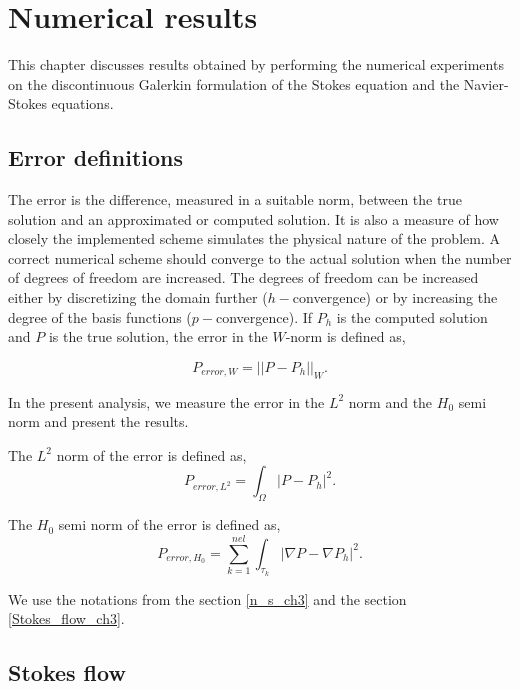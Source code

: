 \documentclass[a4paper,twoside,openright]{book}
\begin{document}
\chapter{Numerical results}

This chapter discusses results obtained by performing the numerical experiments on the discontinuous Galerkin formulation of the Stokes equation and the Navier-Stokes equations.

\section{Error definitions}

The error is the difference, measured in a suitable norm, between the true solution and an approximated or computed solution. It is also a measure of how closely the implemented scheme simulates the physical nature of the problem. A correct numerical scheme should converge to the actual solution when the number of degrees of freedom are increased. The degrees of freedom can be increased either by discretizing the domain further ($h-$convergence) or by increasing the degree of the basis functions ($p-$convergence). If $P_h$ is the computed solution and $P$ is the true solution, the error in the $W$-norm is defined as,

\begin{equation} \label{error_definition}
P_{error,W} = ||P - P_h||_{W} \mathrm{.}
\end{equation}

In the present analysis, we measure the error in the $L^2$ norm and the $H_0$ semi norm and present the results.

The $L^2$ norm of the error is defined as,
\begin{equation}
P_{error,L^2} = \int_{\Omega} |P - P_h|^2 \mathrm{.}
\end{equation}

The $H_0$ semi norm of the error is defined as,\begin{equation}
P_{error,H_0} = \sum_{k=1}^{nel} \int_{\tau_k} |\nabla P - \nabla P_h|^2 \mathrm{.}
\end{equation}

We use the notations from the section \ref{n_s_ch3} and the section \ref{Stokes_flow_ch3}.

\section{Stokes flow}\label{Stokes-ch5}
\end{document}
